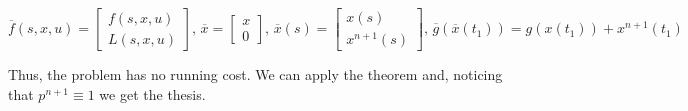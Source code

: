 \begin{equation}
    \overline{f}(s,x,u)=\begin{bmatrix}
        f(s,x,u) \\
        L(s,x,u)
    \end{bmatrix},\,\overline{x}=\begin{bmatrix}
        x \\
        0
    \end{bmatrix},\,\overline{x}(s)=\begin{bmatrix}
        x(s) \\
        x^{n+1}(s)
    \end{bmatrix},\,\overline{g}(\overline{x}(t_1)) = g(x(t_1)) + x^{n+1}(t_1)
\end{equation}

Thus, the problem has no running cost. We can apply the theorem and, noticing that 
$p^{n+1}\equiv1$ we get the thesis.
